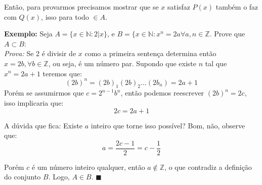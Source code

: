 \documentclass[main.tex]{subfiles}
\begin{document}
Então, para provarmos precisamos mostrar que se $x$ satisfaz $P(x)$ também o faz com $Q(x)$, isso para todo $\in A$.

\textbf{Exemplo: } Seja $A = \lbrace x \in \mathbb{N} : 2|x \rbrace$, e $B = \lbrace x \in \mathbb{N} : x^n = 2a \forall a,n \in \mathbb{Z}$. Prove que $A \subset B$:
\\
\textit{Prova:} Se 2 é divisir de $x$ como a primeira sentença determina então $x = 2b, \forall b \in \mathbb{Z}$, ou seja, é um número par. Supondo que existe $n$ tal que $x^n = 2a + 1$ teremos que:
$$(2b)^n = (2b)_1(2b)_2 \dots (2b_n) = 2a + 1$$
Porém se assumirmos que $c = 2^{n-1}b^n$, então podemos reescrever $(2b)^n = 2c$, isso implicaria que:
$$2c = 2a + 1$$

A dúvida que fica: Existe $a$ inteiro que torne isso possível? Bom, não, observe que:
$$ a  = \frac{2c -  1}{2} = c - \frac{1}{2}$$

Porém $c$ é um número inteiro qualquer, então $a \not\in \mathbb{Z}$, o que contradiz a definição do conjunto $B$. Logo, $A \in B$. $\blacksquare$
\end{document}
